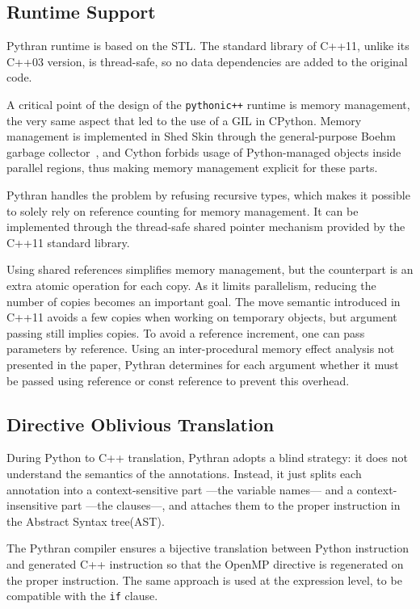\documentclass[conference]{IEEEtran}
\begin{document}
\subsection{Runtime Support}

Pythran runtime is based on the STL. The standard library of C++11, unlike its
C++03 version, is thread-safe, so no data dependencies are added to the original
code.

A critical point of the design of the \texttt{pythonic++} runtime is memory
management, the very same aspect that led to the use of a GIL in CPython.
Memory management is implemented in Shed Skin through the general-purpose Boehm
garbage collector~\cite{boehm1991}, and Cython forbids usage of Python-managed
objects inside parallel regions, thus making memory management explicit for
these parts.

Pythran handles the problem by refusing recursive types, which makes it possible
to solely rely on reference counting for memory management. It can be
implemented through the thread-safe shared pointer mechanism provided by the C++11
standard library.

Using shared references simplifies memory management, but the counterpart is an
extra atomic operation for each copy. As it limits parallelism, reducing the
number of copies becomes an important goal. The move semantic introduced in
C++11 avoids a few copies when working on temporary objects, but argument
passing still implies copies. To avoid a reference increment, one can pass
parameters by reference. Using an inter-procedural memory effect analysis not
presented in the paper, Pythran determines for each argument whether it must be
passed using reference or const reference to prevent this overhead.

\subsection{Directive Oblivious Translation}

During Python to C++ translation, Pythran adopts a blind strategy: it does not
understand the semantics of the annotations. Instead, it just splits each
annotation into a context-sensitive part ---the variable names--- and a
context-insensitive part ---the clauses---, and attaches them to the proper
instruction in the Abstract Syntax tree(AST).

The Pythran compiler ensures a bijective translation between Python instruction
and generated C++ instruction so that the OpenMP directive is regenerated on the
proper instruction. The same approach is used at the expression level, to be
compatible with the \texttt{if} clause.
\end{document}
